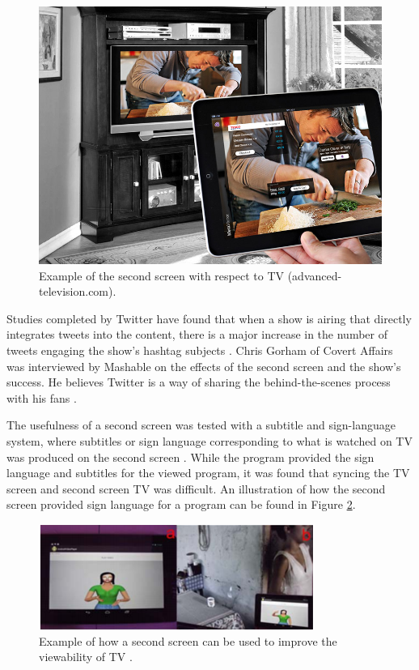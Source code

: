 \documentclass[11pt, oneside]{article}
\begin{document}
\begin{figure}[h!]
    \centering
    \includegraphics[width=.8\textwidth]{second-screen.jpg}
    \caption{Example of the second screen with respect to TV (advanced-television.com).}
    \label{second-screen}
\end{figure}

Studies completed by Twitter have found that when a show is airing that directly integrates tweets into the content, there is a major increase in the number of tweets engaging the show's hashtag subjects \cite{TwitterTV}. Chris Gorham of Covert Affairs was interviewed by Mashable on the effects of the second screen and the show's success. He believes Twitter is a way of sharing the behind-the-scenes process with his fans \cite{MashableChris}. 

The usefulness of a second screen was tested with a subtitle and sign-language system, where subtitles or sign language corresponding to what is watched on TV was produced on the second screen \cite{IEEE_EFS}. While the program provided the sign language and subtitles for the viewed program, it was found that syncing the TV screen and second screen TV was difficult. An illustration of how the second screen provided sign language for a program can be found in Figure \ref{sign-language}.

\begin{figure}[h!]
    \centering
    \includegraphics[width=.8\textwidth]{SignLanguage.png}
    \caption{Example of how a second screen can be used to improve the viewability of TV \cite{IEEE_EFS}.}
    \label{sign-language}
\end{figure}
\end{document}
